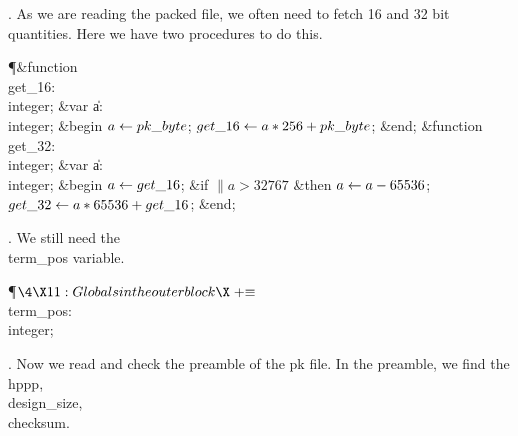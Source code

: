 . As we are reading the packed file, we often need to fetch 16 and 32 bit
quantities.  Here we have two procedures to do this.

\Y\P\4\&{function}\1\  \\{get\_16}: \\{integer};\6
\4\&{var} \|a: \\{integer};\2\6
\&{begin} $\hbox{$a$}\gets\\{pk\_byte}$;\5
$\\{get\_16}\gets\hbox{$a$}\ast256+\\{pk\_byte}$;\6
\&{end};\7
\4\&{function}\1\  \\{get\_32}: \\{integer};\6
\4\&{var} \|a: \\{integer};\2\6
\&{begin} $\hbox{$a$}\gets\\{get\_16}$;\6
\&{if} $\|a>32767$ \1\&{then}\5
$\hbox{$a$}\gets\hbox{$a$}-65536$;\2\6
$\\{get\_32}\gets\hbox{$a$}\ast65536+\\{get\_16}$;\6
\&{end};\par
\fi

. We still need the \\{term\_pos} variable.

\Y\P$\4\X11:Globals in the outer block\X\mathrel{+}\S$\6
\4\\{term\_pos}: \\{integer};\par
\fi

. Now we read and check the preamble of the pk file.  In the preamble, we
find the \\{hppp}, \\{design\_size}, \\{checksum}.

